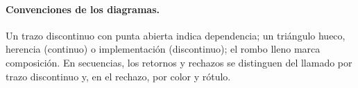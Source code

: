 \paragraph{Convenciones de los diagramas.}
Un trazo discontinuo con punta abierta indica dependencia; un triángulo hueco, herencia (continuo) o implementación (discontinuo); el rombo lleno marca composición. En secuencias, los retornos y rechazos se distinguen del llamado por trazo discontinuo y, en el rechazo, por color y rótulo.
